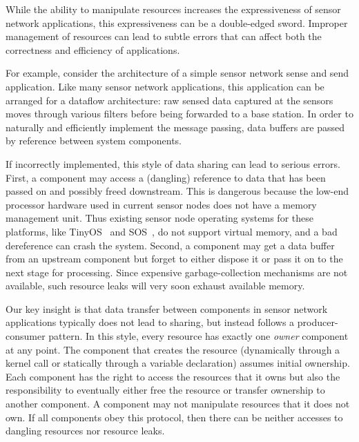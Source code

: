 While the ability to manipulate resources increases the expressiveness of
sensor network applications, this expressiveness can be a double-edged
sword.  
%
Improper management of resources can lead to subtle errors that can affect
both the correctness and efficiency of applications.



For example, consider the architecture of a simple sensor network sense and
send application.  
%
Like many sensor network applications, this application can be arranged for
a dataflow architecture:  raw sensed data captured at the sensors moves
through various filters before being forwarded to a base station.  
%
In order to naturally and efficiently implement the message passing, data
buffers are passed by reference between system components.



If incorrectly implemented, this style of data sharing can lead to serious
errors.  
%
First, a component may access a (dangling) reference to data that has been
passed on and possibly freed downstream. 
%
This is dangerous because the low-end processor hardware used in current
sensor nodes does not have a memory management unit.  
%
Thus existing sensor node operating systems for these platforms, like
TinyOS~\cite{TinyOS} and SOS~\cite{sos}, do not support virtual memory, and
a bad dereference can crash the system. 
%
Second, a component may get a data buffer from an upstream component but
forget to either dispose it or pass it on to the next stage for processing.
%
Since expensive garbage-collection mechanisms are not available, such
resource leaks will very soon exhaust available memory.



Our key insight is that data transfer between components in sensor network
applications typically does not lead to sharing, but instead follows a
producer-consumer pattern.  
%
In this style, every resource has exactly one {\em owner} component at any
point.  
%
The component that creates the resource (dynamically through a kernel call
or statically through a variable declaration) assumes initial ownership.  
%
Each component has the right to access the resources that it owns but also
the responsibility to eventually either free the resource or transfer
ownership to another component.  
%
A component may not manipulate resources that it does not own.  
%
If all components obey this protocol, then there can be neither accesses to
dangling resources nor resource leaks.



